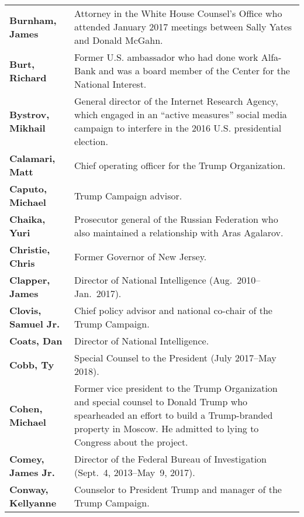 \begin{longtable}{ p{} p{} }
    \textbf{Burnham, James} & Attorney in the White House Counsel's Office who attended January 2017 meetings between Sally Yates and Donald McGahn. \\

    \textbf{Burt, Richard} & Former U.S. ambassador who had done work Alfa-Bank and was a board member of the Center for the National Interest. \\

    \textbf{Bystrov, Mikhail} & General director of the Internet Research Agency, which engaged in an ``active measures'' social media campaign to interfere in the 2016 U.S. presidential election. \\

    \textbf{Calamari, Matt} & Chief operating officer for the Trump Organization. \\

    \textbf{Caputo, Michael} & Trump Campaign advisor. \\

    \textbf{Chaika, Yuri} & Prosecutor general of the Russian Federation who also maintained a relationship with Aras Agalarov. \\

    \textbf{Christie, Chris} & Former Governor of New Jersey. \\

    \textbf{Clapper, James} & Director of National Intelligence (Aug.~2010--Jan.~2017). \\

    \textbf{Clovis, Samuel Jr.} & Chief policy advisor and national co-chair of the Trump Campaign. \\

    \textbf{Coats, Dan} & Director of National Intelligence. \\

    \textbf{Cobb, Ty} & Special Counsel to the President (July 2017--May 2018). \\

    \textbf{Cohen, Michael} & Former vice president to the Trump Organization and special counsel to Donald Trump who spearheaded an effort to build a Trump-branded property in Moscow. He admitted to lying to Congress about the project. \\

    \textbf{Comey, James Jr.} & Director of the Federal Bureau of Investigation (Sept.~4, 2013--May~9, 2017). \\

    \textbf{Conway, Kellyanne} & Counselor to President Trump and manager of the Trump Campaign. \\


\end{longtable}
